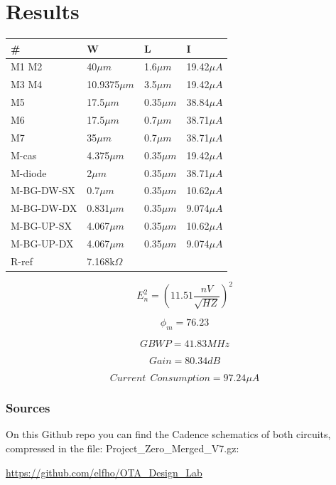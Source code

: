 \newpage

\section{Results}

\centering
\label{my-label}
\begin{tabular}{|l|l|l|l|}
\hline
\#      & W         & L     & I      \\ \hline
M1 M2   & 40$\mu m$       & 1.6$\mu m$  & 19.42$\mu A$ \\ \hline
M3 M4   & 10.9375$\mu m$  & 3.5$\mu m$  & 19.42$\mu A$ \\ \hline
M5      & 17.5$\mu m$     & 0.35$\mu m$ & 38.84$\mu A$ \\ \hline
M6      & 17.5$\mu m$     & 0.7$\mu m$  & 38.71$\mu A$ \\ \hline
M7      & 35$\mu m$       & 0.7$\mu m$  & 38.71$\mu A$ \\ \hline
M-cas    & 4.375$\mu m$    & 0.35$\mu m$ & 19.42$\mu A$ \\ \hline
M-diode  & 2$\mu m$        & 0.35$\mu m$ & 38.71$\mu A$ \\ \hline
M-BG-DW-SX & 0.7$\mu m$      & 0.35$\mu m$ & 10.62$\mu A$ \\ \hline
M-BG-DW-DX & 0.831$\mu m$    & 0.35$\mu m$ & 9.074$\mu A$ \\ \hline
M-BG-UP-SX & 4.067$\mu m$    & 0.35$\mu m$ & 10.62$\mu A$ \\ \hline
M-BG-UP-DX & 4.067$\mu m$    & 0.35$\mu m$      & 9.074$\mu A$ \\ \hline
R-ref      & 7.168k$\Omega$ &       &        \\ \hline
\end{tabular}


\begin{equation}
  E_n^2=( 11.51 \frac {nV} { \sqrt{HZ}})^2
\end{equation}

\begin{equation}
  \phi_m=76.23
\end{equation}

\begin{equation}
  GBWP=41.83MHz
\end{equation}

\begin{equation}
  Gain=80.34dB
\end{equation}

\begin{equation}
  Current \ \ Consumption = 97.24 \mu A
\end{equation}


\vfill

\subsubsection{Sources} %
\label{ssub:sources}

On this Github repo you can find the Cadence schematics of both circuits, compressed in the file: Project\_Zero\_Merged\_V7.gz:

\url{https://github.com/elfho/OTA_Design_Lab}	



